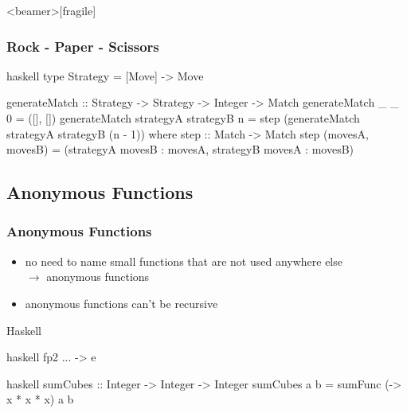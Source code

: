\documentclass[dvipsnames]{beamer}
\theoremstyle{plain}
\begin{document}
\begin{frame}<beamer>[fragile]
  \frametitle{Rock - Paper - Scissors}

  \begin{exampleblock}{}
    \begin{pygments}{haskell}
type Strategy = [Move] -> Move

generateMatch :: Strategy -> Strategy
                     -> Integer -> Match
generateMatch _ _ 0 = ([], [])
generateMatch strategyA strategyB n =
    step (generateMatch strategyA strategyB (n - 1))
      where
        step :: Match -> Match
        step (movesA, movesB) =
            (strategyA movesB : movesA,
             strategyB movesA : movesB)
    \end{pygments}
  \end{exampleblock}
\end{frame}

\subsection{Anonymous Functions}

\begin{frame}[fragile]
  \frametitle{Anonymous Functions}

  \begin{itemize}
    \item no need to name small functions that are not used anywhere else\\
      $\rightarrow$ \alert{anonymous functions}
    \item anonymous functions can't be recursive
  \end{itemize}

  \pause
  \begin{block}{Haskell}
    \begin{pygments}{haskell}
       fp2 ... -> e
    \end{pygments}
  \end{block}

  \medskip
  \begin{example}{}
    \begin{pygments}{haskell}
sumCubes :: Integer -> Integer -> Integer
sumCubes a b = sumFunc (\x -> x * x * x) a b
    \end{pygments}
  \end{example}
\end{frame}
\end{document}
